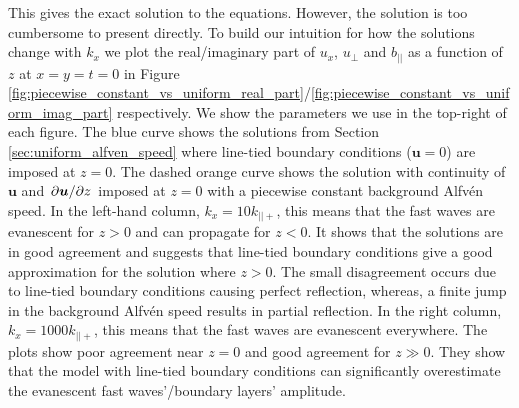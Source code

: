 \documentclass[linenumbers]{aastex63}
\let\vec\boldsymbol
\begin{document}
This gives the exact solution to the equations. However, the solution is too cumbersome to present directly. To build our intuition for how the solutions change with $k_x$ we plot the real/imaginary part of $u_x$, $u_\perp$ and $\hat{b}_{||}$  as a function of $z$ at $x=y=t=0$ in Figure \ref{fig:piecewise_constant_vs_uniform_real_part}/\ref{fig:piecewise_constant_vs_uniform_imag_part} respectively. We show the parameters we use in the top-right of each figure. The blue curve shows the solutions from Section \ref{sec:uniform_alfven_speed} where line-tied boundary conditions ($\vec{u}=0$) are imposed at $z=0$. The dashed orange curve shows the solution with continuity of $\vec{u}$ and $\pdv*{\vec{u}}{z}$ imposed at $z=0$ with a piecewise constant background Alfv\'en speed. In the left-hand column, $k_x=10k_{||+}$, this means that the fast waves are evanescent for $z>0$ and can propagate for $z<0$. It shows that the solutions are in good agreement and suggests that line-tied boundary conditions give a good approximation for the solution where $z>0$. The small disagreement occurs due to line-tied boundary conditions causing perfect reflection, whereas, a finite jump in the background Alfv\'en speed results in partial reflection. In the right column, $k_x=1000k_{||+}$, this means that the fast waves are evanescent everywhere. The plots show poor agreement near $z=0$ and good agreement for $z\gg0$. They show that the model with line-tied boundary conditions can significantly overestimate the evanescent fast waves'/boundary layers' amplitude.
\end{document}
